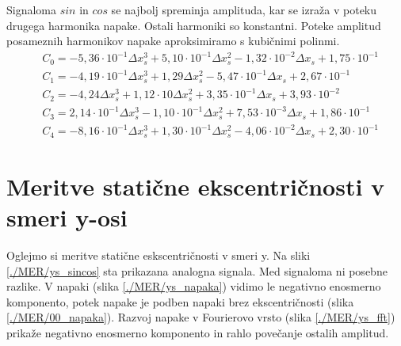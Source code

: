 Signaloma $sin$ in $cos$ se najbolj spreminja amplituda, kar se izraža v poteku drugega harmonika napake. Ostali harmoniki so konstantni.
Poteke amplitud posameznih harmonikov napake aproksimiramo s kubičnimi polinmi.
\begin{eqnarray}
&C_0 =-5,36\cdot 10^{-1}\Delta x_s^{3}+5,10\cdot 10^{-1}\Delta x_s^{2}-1,32\cdot 10^{-2}\Delta x_s+1,75\cdot 10^{-1} \\
&C_1 =-4,19\cdot 10^{-1}\Delta x_s^{3}+1,29\Delta x_s^{2}-5,47\cdot 10^{-1}\Delta x_s+2,67\cdot 10^{-1} \\             
&C_2 =-4,24\Delta x_s^{3}+1,12\cdot 10\Delta x_s^{2}+3,35\cdot 10^{-1}\Delta x_s+3,93\cdot 10^{-2} \\                  
&C_3 =2,14\cdot 10^{-1}\Delta x_s^{3}-1,10\cdot 10^{-1}\Delta x_s^{2}+7,53\cdot 10^{-3}\Delta x_s+1,86\cdot 10^{-1} \\ 
&C_4 =-8,16\cdot 10^{-1}\Delta x_s^{3}+1,30\cdot 10^{-1}\Delta x_s^{2}-4,06\cdot 10^{-2}\Delta x_s+2,30\cdot 10^{-1}
\end{eqnarray}





\section{Meritve statične ekscentričnosti v smeri y-osi}
Oglejmo si meritve statične eskscentričnosti v smeri y.
Na sliki \ref{./MER/ys_sincos} sta prikazana analogna signala. Med signaloma ni posebne razlike. V napaki (slika \ref{./MER/ys_napaka}) vidimo le negativno enosmerno komponento, potek napake je podben napaki brez ekscentričnosti (slika \ref{./MER/00_napaka}). Razvoj napake v Fourierovo vrsto (slika \ref{./MER/ys_fft}) prikaže negativno enosmerno komponento in rahlo povečanje ostalih amplitud.

